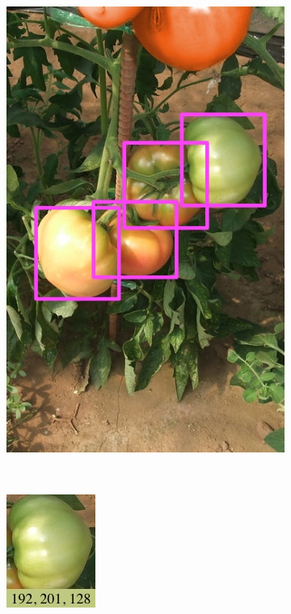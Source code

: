 \begin{figure}[t]
\begin{subfigure}[b]{0.2\linewidth}
    \includegraphics[width=\textwidth]{1}
  \end{subfigure}
  \hspace{\fill}
  ~
  \begin{subfigure}[b]{0.25\linewidth}
    \includegraphics[width=.5\textwidth]{2a}~

\end{subfigure}
\end{figure}
